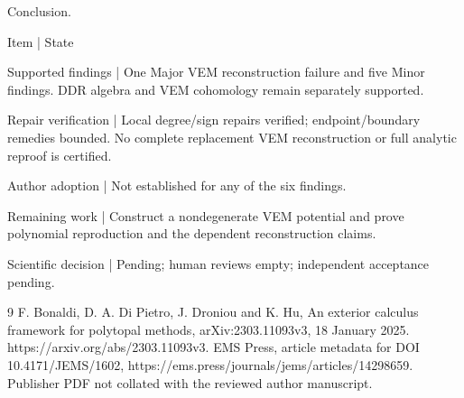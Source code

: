 \documentclass[10pt]{article}
\begin{document}
Conclusion.\par
Item | State\par
Supported findings | One Major VEM reconstruction failure and five Minor findings. DDR algebra and VEM cohomology remain separately supported.\par
Repair verification | Local degree/sign repairs verified; endpoint/boundary remedies bounded. No complete replacement VEM reconstruction or full analytic reproof is certified.\par
Author adoption | Not established for any of the six findings.\par
Remaining work | Construct a nondegenerate VEM potential and prove polynomial reproduction and the dependent reconstruction claims.\par
Scientific decision | Pending; human reviews empty; independent acceptance pending.\par
9 F. Bonaldi, D. A. Di Pietro, J. Droniou and K. Hu, An exterior calculus framework for polytopal methods, arXiv:2303.11093v3, 18 January 2025. https://arxiv.org/abs/2303.11093v3. EMS Press, article metadata for DOI 10.4171/JEMS/1602, https://ems.press/journals/jems/articles/14298659. Publisher PDF not collated with the reviewed author manuscript.\par
\end{document}
